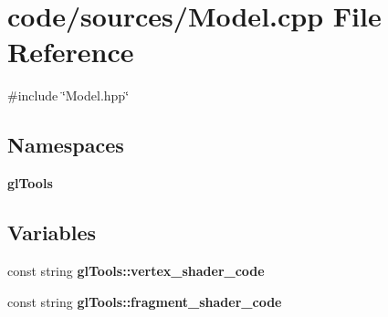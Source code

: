 \section{code/sources/\+Model.cpp File Reference}
\label{sources_2_model_8cpp}
{\ttfamily \#include \char`\"{}Model.\+hpp\char`\"{}}\newline
\subsection*{Namespaces}
\begin{DoxyCompactItemize}
\item 
 \textbf{ gl\+Tools}
\end{DoxyCompactItemize}
\subsection*{Variables}
\begin{DoxyCompactItemize}
\item 
const string \textbf{ gl\+Tools\+::vertex\+\_\+shader\+\_\+code}
\item 
const string \textbf{ gl\+Tools\+::fragment\+\_\+shader\+\_\+code}
\end{DoxyCompactItemize}
